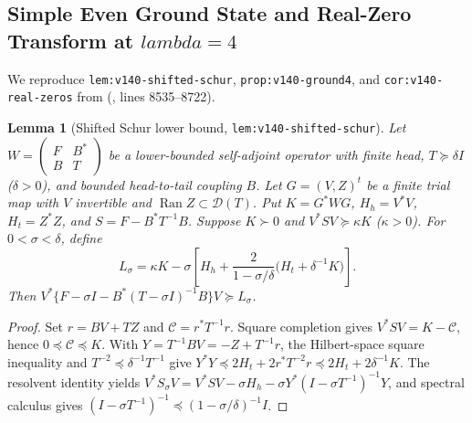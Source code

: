 \documentclass[11pt]{article}
\def\lambda{lambda}%
\newtheorem{lemma}[theorem]{Lemma}
\theoremstyle{remark}
\begin{document}
\subsection{Simple Even Ground State and Real-Zero Transform at \texorpdfstring{$\lambda = 4$}{lambda = 4}}
We reproduce \texttt{lem:v140-shifted-schur}, \texttt{prop:v140-ground4}, and \texttt{cor:v140-real-zeros} from  (, lines 8535--8722).

\begin{lemma}[Shifted Schur lower bound, \texttt{lem:v140-\allowbreak shifted-\allowbreak schur}]
\label{lem:v140-shifted-schur}
Let $W = \left(\begin{smallmatrix} F & B^* \\ B & T \end{smallmatrix}\right)$ be a lower-bounded self-adjoint operator with finite head, $T \succeq \delta I$ ($\delta > 0$), and bounded head-to-tail coupling $B$. Let $G = (V, Z)^t$ be a finite trial map with $V$ invertible and $\operatorname{Ran} Z \subset \mathcal{D}(T)$. Put $K = G^* W G$, $H_h = V^* V$, $H_t = Z^* Z$, and $S = F - B^* T^{-1} B$. Suppose $K \succ 0$ and $V^* S V \succeq \kappa K$ ($\kappa > 0$). For $0 < \sigma < \delta$, define
\begin{equation}\label{eq:v140-shifted-lower}
  L_\sigma = \kappa K - \sigma\left[H_h + \frac{2}{1 - \sigma/\delta}\bigl(H_t + \delta^{-1}K\bigr)\right].
\end{equation}
Then $V^*\{F - \sigma I - B^*(T - \sigma I)^{-1}B\}V \succeq L_\sigma$.
\end{lemma}
\begin{proof}
Set $r = BV + TZ$ and $\mathcal{C} = r^* T^{-1} r$. Square completion gives $V^* S V = K - \mathcal{C}$, hence $0 \preceq \mathcal{C} \preceq K$. With $Y = T^{-1} B V = -Z + T^{-1} r$, the Hilbert-space square inequality and $T^{-2} \preceq \delta^{-1} T^{-1}$ give $Y^* Y \preceq 2H_t + 2r^* T^{-2} r \preceq 2H_t + 2\delta^{-1}K$. The resolvent identity yields $V^* S_\sigma V = V^* S V - \sigma H_h - \sigma Y^*(I - \sigma T^{-1})^{-1}Y$, and spectral calculus gives $(I - \sigma T^{-1})^{-1} \preceq (1 - \sigma/\delta)^{-1}I$.
\end{proof}
\end{document}

